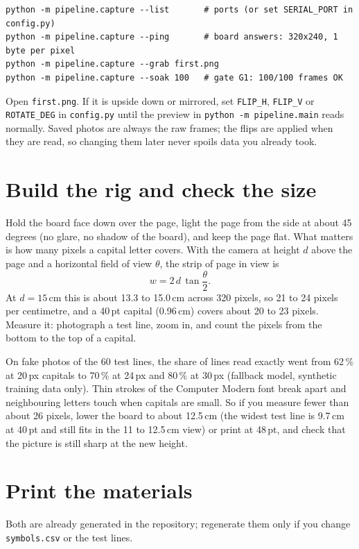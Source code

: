 \documentclass[11pt]{article}
\newcommand{\cmd}[1]{\texttt{#1}}
\begin{document}
\begin{lstlisting}
python -m pipeline.capture --list       # ports (or set SERIAL_PORT in config.py)
python -m pipeline.capture --ping       # board answers: 320x240, 1 byte per pixel
python -m pipeline.capture --grab first.png
python -m pipeline.capture --soak 100   # gate G1: 100/100 frames OK
\end{lstlisting}

Open \cmd{first.png}. If it is upside down or mirrored, set \cmd{FLIP\_H}, \cmd{FLIP\_V} or
\cmd{ROTATE\_DEG} in \cmd{config.py} until the preview in \cmd{python -m pipeline.main} reads
normally. Saved photos are always the raw frames; the flips are applied when they are read, so
changing them later never spoils data you already took.

\section{Build the rig and check the size}
\label{sec:rig}

Hold the board face down over the page, light the page from the side at about 45 degrees (no
glare, no shadow of the board), and keep the page flat. What matters is how many pixels a capital
letter covers. With the camera at height $d$ above the page and a horizontal field of view
$\theta$, the strip of page in view is
\[
  w = 2\,d\,\tan\frac{\theta}{2}.
\]
At $d = 15$\,cm this is about 13.3 to 15.0\,cm across 320 pixels, so 21 to 24 pixels per
centimetre, and a 40\,pt capital (0.96\,cm) covers about 20 to 23 pixels. Measure it: photograph
a test line, zoom in, and count the pixels from the bottom to the top of a capital.

On fake photos of the 60 test lines, the share of lines read exactly went from 62\,\% at
20\,px capitals to 70\,\% at 24\,px and 80\,\% at 30\,px (fallback model, synthetic training data
only). Thin strokes of the Computer Modern font break apart and neighbouring letters touch when
capitals are small. So if you measure fewer than about 26 pixels, lower the board to about
12.5\,cm (the widest test line is 9.7\,cm at 40\,pt and still fits in the 11 to 12.5\,cm view)
or print at 48\,pt, and check that the picture is still sharp at the new height.

\section{Print the materials}

Both are already generated in the repository; regenerate them only if you change
\cmd{symbols.csv} or the test lines.
\end{document}
